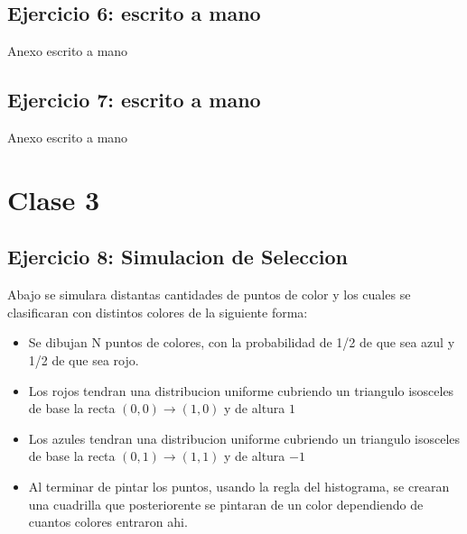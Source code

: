 \documentclass[12pt, a4paper]{article}
\begin{document}
\subsection{Ejercicio 6: escrito a mano}
Anexo escrito a mano
\subsection{Ejercicio 7: escrito a mano}
Anexo escrito a mano
\section{Clase 3}
\subsection{Ejercicio 8: Simulacion de Seleccion}

Abajo se simulara distantas cantidades de puntos de color y los cuales se clasificaran con distintos colores de la siguiente forma:
\begin{itemize}
	\item Se dibujan N puntos de colores, con la probabilidad de 1/2 de que sea azul y 1/2 de que sea rojo.
	\item Los rojos tendran una distribucion uniforme cubriendo un triangulo isosceles de base la recta $(0,0)\rightarrow(1,0)$ y de altura $1$
	\item Los azules tendran una distribucion uniforme cubriendo un triangulo isosceles de base la recta $(0,1)\rightarrow(1,1)$ y de altura $-1$
	\item Al terminar de pintar los puntos, usando la regla del histograma, se crearan una cuadrilla que posteriorente se pintaran de un color dependiendo de cuantos colores entraron ahi.
\end{itemize}
\end{document}

